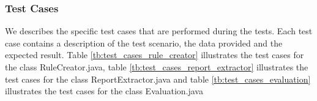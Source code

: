 \subsubsection*{Test Cases}
We describes the specific test cases that are performed during the tests. Each test case contains a description of the test scenario, the data provided and the expected result. Table \ref{tb:test_cases_rule_creator} illustrates the test cases for the class RuleCreator.java, table \ref{tb:test_cases_report_extractor} illustrates the test cases for the class ReportExtractor.java and table \ref{tb:test_cases_evaluation} illustrates the test cases for the class Evaluation.java

\thispagestyle{empty}
\begingroup
\centering
\scriptsize
\renewcommand{\arraystretch}{1,5} 
\keepXColumns
	
